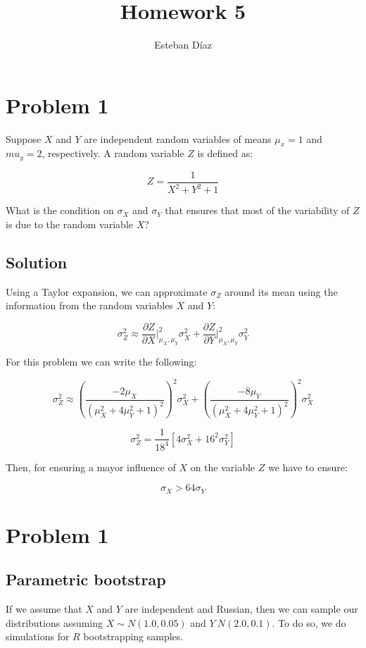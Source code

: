 \documentclass[10pt]{article}
\author{Esteban D\'{i}az}
\title{Homework 5}{}
\def\der#1#2#3{
\frac{\partial #1}{\partial #2}\bigg|_{#3}
}
\begin{document}
\maketitle

\section{Problem 1}
Suppose $X$ and $Y$ are independent random variables of means $\mu_x=1$ and
$mu_y=2$, respectively. A random variable $Z$ is defined as:

    \[
      Z = \frac{1}{X^2 +Y^2 +1}
    \]

What is the condition on $\sigma_X$ and $\sigma_Y$ that ensures that most 
of the variability of $Z$ is due to the random variable $X$?

\subsection{Solution}

Using a Taylor expansion, we can approximate $\sigma_Z$ around its mean 
using the information from the random variables $X$ and $Y$:

    \[
    \sigma_Z^2 \approx \der{Z}{X}{\mu_X,\mu_Y}^2\sigma_X^2 + \der{Z}{Y}{\mu_X,\mu_Y}^2 \sigma_Y^2 
    \]


For this problem we can write the following:

    \[
    \sigma_Z^2 \approx \left(\frac{-2\mu_X}{\left(\mu_X^2+4\mu_Y^2+1\right)^2}\right)^2 \sigma_X^2 +\left(\frac{-8\mu_Y}{\left(\mu_X^2+4\mu_Y^2+1\right)^2}\right)^2 \sigma_X^2
    \]

    \[
    \sigma_Z^2 = \frac{1}{18^4} \left[ 4\sigma_X^2 +16^2\sigma_Y^2  \right]
    \]

    Then, for ensuring a mayor influence of $X$ on the variable $Z$ we have to ensure:

    \[
    \sigma_X > 64\sigma_Y
    \]

\section{Problem 1}

\subsection{Parametric bootstrap}
If we assume that $X$ and $Y$ are independent and Russian, then we can 
sample our distributions assuming $X\sim N(1.0,0.05)$ and $Y~N(2.0,0.1)$. 
To do so, we do simulations for $R$ bootstrapping samples. 
\end{document}
